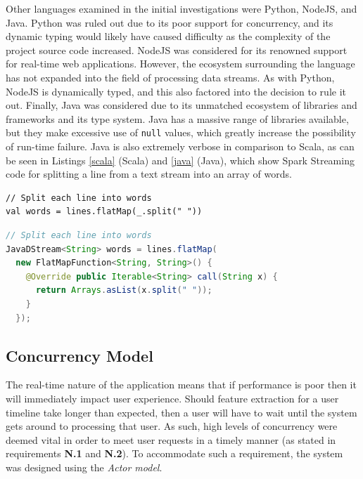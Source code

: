 \documentclass{l4proj}
\newcommand{\code}[1]{\texttt{#1}}
\begin{document}
        Other languages examined in the initial investigations were Python, NodeJS, and Java. Python was ruled out due to its poor support for concurrency, and its dynamic typing would likely have caused difficulty as the complexity of the project source code increased. NodeJS was considered for its renowned support for real-time web applications. However, the ecosystem surrounding the language has not expanded into the field of processing data streams. As with Python, NodeJS is dynamically typed, and this also factored into the decision to rule it out. Finally, Java was considered due to its unmatched ecosystem of libraries and frameworks and its type system. Java has a massive range of libraries available, but they make excessive use of \code{null} values, which greatly increase the possibility of run-time failure. Java is also extremely verbose in comparison to Scala, as can be seen in Listings \ref{scala} (Scala) and \ref{java} (Java), which show Spark Streaming code for splitting a line from a text stream into an array of words.

\begin{lstlisting}[caption=Scala example of splitting a line in Spark Streaming.,label=scala]
// Split each line into words
val words = lines.flatMap(_.split(" "))
\end{lstlisting}

\begin{lstlisting}[language=Java,caption=Java example of splitting a line in Spark Streaming,label=java]
// Split each line into words
JavaDStream<String> words = lines.flatMap(
  new FlatMapFunction<String, String>() {
    @Override public Iterable<String> call(String x) {
      return Arrays.asList(x.split(" "));
    }
  });
\end{lstlisting}




    \subsection{Concurrency Model}
    
    The real-time nature of the application means that if performance is poor then it will immediately impact user experience. Should feature extraction for a user timeline take longer than expected, then a user will have to wait until the system gets around to processing that user. As such, high levels of concurrency were deemed vital in order to meet user requests in a timely manner (as stated in requirements \textbf{N.1} and \textbf{N.2}). To accommodate such a requirement, the system was designed using the \textit{Actor model}.
    
\end{document}
